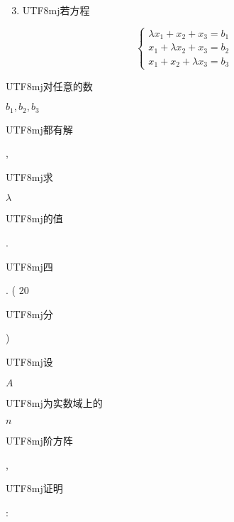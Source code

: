 \documentclass[10pt]{article}
\begin{document}
\begin{enumerate}
  \setcounter{enumi}{2}
  \item \begin{CJK}{UTF8}{mj}若方程\end{CJK}
\end{enumerate}
$$
\left\{\begin{array}{l}
\lambda x_{1}+x_{2}+x_{3}=b_{1} \\
x_{1}+\lambda x_{2}+x_{3}=b_{2} \\
x_{1}+x_{2}+\lambda x_{3}=b_{3}
\end{array}\right.
$$
\begin{CJK}{UTF8}{mj}对任意的数\end{CJK} $b_{1}, b_{2}, b_{3}$ \begin{CJK}{UTF8}{mj}都有解\end{CJK}, \begin{CJK}{UTF8}{mj}求\end{CJK} $\lambda$ \begin{CJK}{UTF8}{mj}的值\end{CJK}.

\begin{CJK}{UTF8}{mj}四\end{CJK}. ( 20 \begin{CJK}{UTF8}{mj}分\end{CJK}) \begin{CJK}{UTF8}{mj}设\end{CJK} $A$ \begin{CJK}{UTF8}{mj}为实数域上的\end{CJK} $n$ \begin{CJK}{UTF8}{mj}阶方阵\end{CJK}, \begin{CJK}{UTF8}{mj}证明\end{CJK}:
\end{document}
